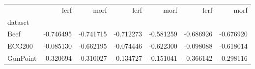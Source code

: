 \begin{tabular}{lrrrrrr}
\toprule
{} &      lerf &      morf &      lerf &      morf &      lerf &      morf \\
dataset  &           &           &           &           &           &           \\
\midrule
Beef     & -0.746495 & -0.741715 & -0.712273 & -0.581259 & -0.686926 & -0.676920 \\
ECG200   & -0.085130 & -0.662195 & -0.074446 & -0.622300 & -0.098088 & -0.618014 \\
GunPoint & -0.320694 & -0.310027 & -0.134727 & -0.151041 & -0.366142 & -0.298116 \\
\bottomrule
\end{tabular}
